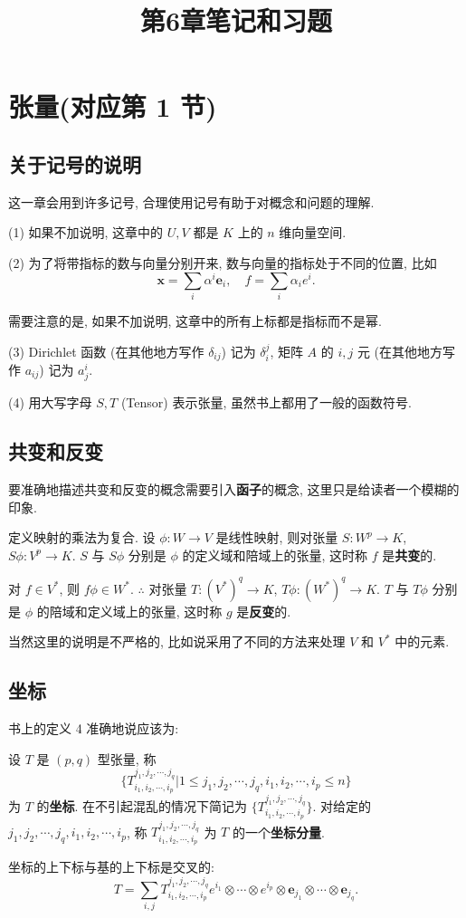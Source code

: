 \documentclass{ctexart}
\title{第6章笔记和习题}
\begin{document}
\maketitle
\section{张量(对应第 1 节)}
\subsection{关于记号的说明}
这一章会用到许多记号, 合理使用记号有助于对概念和问题的理解.

(1) 如果不加说明, 这章中的 $U,V$ 都是 $K$ 上的 $n$ 维向量空间.

(2) 为了将带指标的数与向量分别开来, 数与向量的指标处于不同的位置, 比如
\[\boldsymbol{x}=\sum\limits_i\alpha^i\boldsymbol{e}_i,\quad f=\sum\limits_i\alpha_ie^i.\]

需要注意的是, 如果不加说明, 这章中的所有上标都是指标而不是幂.

(3) Dirichlet 函数 (在其他地方写作 $\delta_{ij}$) 记为 $\delta_i^j$, 矩阵 $A$ 的 $i,j$ 元 (在其他地方写作 $a_{ij}$) 记为 $a_j^i$.

(4) 用大写字母 $S,T$ (Tensor) 表示张量, 虽然书上都用了一般的函数符号.
\subsection{共变和反变}
要准确地描述共变和反变的概念需要引入\textbf{函子}的概念, 这里只是给读者一个模糊的印象.

定义映射的乘法为复合. 设 $\phi:W\to V$ 是线性映射, 则对张量 $S:W^p\to K$, $S\phi:V^p\to K$. $S$ 与 $S\phi$ 分别是 $\phi$ 的定义域和陪域上的张量, 这时称 $f$ 是\textbf{共变}的.

对 $f\in V^*$, 则 $f\phi\in W^*$. $\therefore$ 对张量 $T:(V^*)^q\to K$, $T\phi:(W^*)^q\to K$. $T$ 与 $T\phi$ 分别是 $\phi$ 的陪域和定义域上的张量, 这时称 $g$ 是\textbf{反变}的.

当然这里的说明是不严格的, 比如说采用了不同的方法来处理 $V$ 和 $V^*$ 中的元素.
\subsection{坐标}
书上的定义 4 准确地说应该为:
\begin{definition}
    设 $T$ 是 $(p,q)$ 型张量, 称
    \[\{T^{j_1,j_2,\cdots,j_q}_{i_1,i_2,\cdots,i_p}|1\leq j_1,j_2,\cdots,j_q,i_1,i_2,\cdots,i_p\leq n\}\]
    为 $T$ 的\textbf{坐标}. 在不引起混乱的情况下简记为 $\{T^{j_1,j_2,\cdots,j_q}_{i_1,i_2,\cdots,i_p}\}$. 对给定的 $j_1,j_2,\cdots,j_q,i_1,i_2,\cdots,i_p$, 称 $T^{j_1,j_2,\cdots,j_q}_{i_1,i_2,\cdots,i_p}$ 为 $T$ 的一个\textbf{坐标分量}.
\end{definition}
坐标的上下标与基的上下标是交叉的:
\[T=\sum\limits_{i,j}T^{j_1,j_2,\cdots,j_q}_{i_1,i_2,\cdots,i_p}e^{i_1}\otimes\cdots\otimes e^{i_p}\otimes\boldsymbol{e}_{j_1}\otimes\cdots\otimes\boldsymbol{e}_{j_q}.\]
\end{document}
